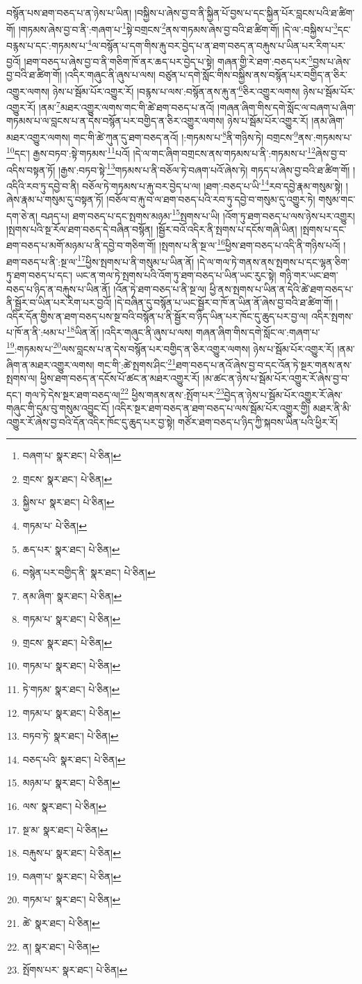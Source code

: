 བསྙོན་པས་ཐག་བཅད་པ་ན་ཉེས་པ་ཡིན། །བསྐྱིས་པ་ཞེས་བྱ་བ་ནི་སྐྱིན་པོ་བྱས་པ་དང་སྐྱིན་པོར་བླངས་པའི་ཐ་ཚིག་གོ། །གཏམས་ཞེས་བྱ་བ་ནི་:གཞག་པ་\footnote{བཞག་པ་  སྣར་ཐང་།  པེ་ཅིན། }སྟེ་བགྲངས་\footnote{གྲངས་  སྣར་ཐང་།  པེ་ཅིན། }ནས་གཏམས་ཞེས་བྱ་བའི་ཐ་ཚིག་གོ། །དེ་ལ་:བསྐྱིས་པ་\footnote{སྐྱིས་པ་  སྣར་ཐང་།  པེ་ཅིན། }དང་བརྙས་པ་དང་:གཏམས་པ་\footnote{གཏམ་པ་  པེ་ཅིན། }ལ་བསྙོན་པ་དག་གིས་རྐུ་བར་བྱེད་པ་ན་ཐག་བཅད་ན་བརྐུས་པ་ཡིན་པར་རིག་པར་བྱའོ། །ཐག་བཅད་པ་ཞེས་བྱ་བ་ནི་གཅིག་ཁོ་ནར་ཆད་པར་བྱེད་པ་སྟེ། གཞན་གྱི་རེ་ཐག་:བཅད་པར་\footnote{ཆད་པར་  སྣར་ཐང་།  པེ་ཅིན། }བྱས་པ་ཞེས་བྱ་བའི་ཐ་ཚིག་གོ། །འདིར་གཞུང་ནི་ཞུས་པ་ལས། བཙུན་པ་དགེ་སློང་གིས་བསྐྱིས་ནས་བསྙོན་པར་བགྱིད་ན་ཅིར་འགྱུར་ལགས། ཉེས་པ་སྦོམ་པོར་འགྱུར་རོ། །བརྙས་པ་ལས་:བསྙོན་ནས་རྐུ་ན་\footnote{བསྙེན་པར་བགྱིད་ནི་  སྣར་ཐང་།  པེ་ཅིན། }ཅིར་འགྱུར་ལགས། ཉེས་པ་སྦོམ་པོར་འགྱུར་རོ། །ནམ་\footnote{ནམ་ཞིག་  སྣར་ཐང་།  པེ་ཅིན། }མཐར་འགྱུར་ལགས་གང་གི་ཚེ་ཐག་བཅད་པ་ནའོ། །གཞན་ཞིག་གིས་དགེ་སློང་ལ་བཞག་པ་ཞིག་གཏམས་པ་ལ་བླངས་པ་ན་དེས་བསྙོན་པར་བགྱིད་ན་ཅིར་འགྱུར་ལགས། ཉེས་པ་སྦོམ་པོར་འགྱུར་རོ། །ནམ་ཞིག་མཐར་འགྱུར་ལགས། གང་གི་ཚེ་ཀུན་དུ་ཐག་བཅད་ནའོ། །:གཏམས་པ་\footnote{གཏམ་པ་  སྣར་ཐང་།  པེ་ཅིན། }ནི་གཉིས་ཏེ། བགྲངས་\footnote{གྲངས་  སྣར་ཐང་།  པེ་ཅིན། }ནས་:གཏམས་པ་\footnote{གཏམ་པ་  སྣར་ཐང་།  པེ་ཅིན། }དང་། རྒྱས་བཏབ་:སྟེ་གཏམས་\footnote{ཏེ་གཏམ་  སྣར་ཐང་།  པེ་ཅིན། }པའོ། །དེ་ལ་གང་ཞིག་བགྲངས་ནས་གཏམས་པ་ནི་:གཏམས་པ་\footnote{གཏམ་པ་  སྣར་ཐང་།  པེ་ཅིན། }ཞེས་བྱ་བ་འདིས་བསྟན་ཏོ། །རྒྱས་:བཏབ་སྟེ་\footnote{བཏབ་ཏེ་  སྣར་ཐང་།  པེ་ཅིན། }གཏམས་པ་ནི་བཅོལ་ཏེ་བཞག་པའོ་ཞེས་ཏེ། གཏད་པ་ཞེས་བྱ་བའི་ཐ་ཚིག་གོ། །འདིའི་རབ་ཏུ་དབྱེ་བ་ནི། བཅོལ་ཏེ་གཏམས་པ་རྐུ་བར་བྱེད་པ་ལ། །ཐག་:བཅད་པ་ཡི་\footnote{བཅད་པའི་  སྣར་ཐང་།  པེ་ཅིན། }རབ་དབྱེ་རྣམ་གསུམ་སྟེ། །ཞེས་རྣམ་པ་གསུམ་དུ་བསྟན་ཏོ། །བཅོལ་བ་རྐུ་བ་ལ་ཐག་བཅད་པའི་རབ་ཏུ་དབྱེ་བ་གསུམ་དུ་འགྱུར་ཏེ། གསུམ་གང་དག་ཅེ་ན། བཤད་པ། ཐག་བཅད་པ་དང་སྤགས་མཉམ་\footnote{མཉམ་པ་  སྣར་ཐང་།  པེ་ཅིན། }སྤགས་པ་ཡི། །འོག་ཏུ་ཐག་བཅད་པ་ལས་ཉེས་པར་འགྱུར། །སྤགས་པའི་སྔ་རོལ་ཐག་བཅད་དེ་བཞིན་བསྙོན། །སྦྱོར་བའོ་འདིར་ནི་སྤགས་པ་དངོས་གཞི་ཡིན། །སྤགས་པ་དང་ཐག་བཅད་པ་མགོ་མཉམ་པ་ནི་དབྱེ་བ་གཅིག་གོ། །སྤགས་པ་ནི་སྔ་ལ་\footnote{ལས་  སྣར་ཐང་།  པེ་ཅིན། }ཕྱིས་ཐག་བཅད་པ་འདི་ནི་གཉིས་པའོ། །ཐག་བཅད་པ་ནི་:སྔ་ལ་\footnote{སྔ་མ་  སྣར་ཐང་།  པེ་ཅིན། }ཕྱིས་སྤགས་པ་ནི་གསུམ་པ་ཡིན་ནོ། །དེ་ལ་གལ་ཏེ་གནས་ནས་སྤགས་པ་དང་ལྷན་ཅིག་ཏུ་ཐག་བཅད་པ་དང་། ཡང་ན་གལ་ཏེ་སྤགས་པའི་འོག་ཏུ་ཐག་བཅད་པ་ཡིན་ཡང་རུང་སྟེ། གཉི་གར་ཡང་ཐག་བཅད་པ་ཉིད་ན་བརྐུས་པ་ཡིན་ནོ། །འོན་ཏེ་ཐག་བཅད་པ་ནི་སྔ་ལ། ཕྱི་ནས་སྤགས་པ་ཡིན་ན་དེའི་ཚེ་ཐག་བཅད་པ་ནི་སྦྱོར་བ་ཡིན་པར་རིག་པར་བྱའོ། །དེ་བཞིན་དུ་བསྙོན་པ་ཡང་སྦྱོར་བ་ཁོ་ན་ཡིན་ནོ་ཞེས་བྱ་བའི་ཐ་ཚིག་གོ། །འདིར་དོན་གྱིས་ན་ཐག་བཅད་པས་སྔ་བའི་བསྙོན་པ་ནི་སྦྱོར་བ་ཉིད་ཡིན་པར་ཁོང་དུ་ཆུད་པར་བྱ་ལ། འདིར་སྤགས་པ་ཁོ་ན་ནི་:ཕམ་པ་\footnote{བརྐུས་པ་  སྣར་ཐང་།  པེ་ཅིན། }ཡིན་ནོ། །འདིར་གཞུང་ནི་ཞུས་པ་ལས། གཞན་ཞིག་གིས་དགེ་སློང་ལ་:གཞག་པ་\footnote{བཞག་པ་  སྣར་ཐང་།  པེ་ཅིན། }:གཏམས་པ་\footnote{གཏམ་པ་  སྣར་ཐང་།  པེ་ཅིན། }ལས་བླངས་པ་ན་དེས་བསྙོན་པར་བགྱིད་ན་ཅིར་འགྱུར་ལགས། ཉེས་པ་སྦོམ་པོར་འགྱུར་རོ། །ནམ་ཞིག་ན་མཐར་འགྱུར་ལགས། གང་གི་:ཚེ་སྤགས་ཤིང་\footnote{ཚེ་  སྣར་ཐང་།  པེ་ཅིན། }ཐག་བཅད་པ་ནའོ་ཞེས་བྱ་བ་དང་འོན་ཏེ་སྔར་གནས་ནས་སྤགས་ལ། ཕྱིས་ཐག་བཅད་ན་དངོས་པོ་ཚང་ན་མཐར་འགྱུར་རོ། །མ་ཚང་ན་ཉེས་པ་སྦོམ་པོར་འགྱུར་རོ་ཞེས་བྱ་བ་དང་། གལ་ཏེ་དེས་སྔར་ཐག་བཅད་ལ།\footnote{ན།  སྣར་ཐང་།  པེ་ཅིན། } ཕྱིས་གནས་ནས་:སྤོག་པར་\footnote{སྤོགས་པར་  སྣར་ཐང་།  པེ་ཅིན། }བྱེད་ན་ཉེས་པ་སྦོམ་པོར་འགྱུར་རོ་ཞེས་གཞུང་གི་དུམ་བུ་གསུམ་འབྱུང་ངོ། །འདིར་སྔར་ཐག་བཅད་ན་ཐག་བཅད་པ་ལས་སྦོམ་པོར་འགྱུར་གྱི། མཐར་ནི་མི་འགྱུར་རོ་ཞེས་བྱ་བའི་དོན་འདིར་ཁོང་དུ་ཆུད་པར་བྱ་སྟེ། གཙོར་ཐག་བཅད་པ་ཉིད་ཀྱི་སྐབས་ཡིན་པའི་ཕྱིར་རོ། 